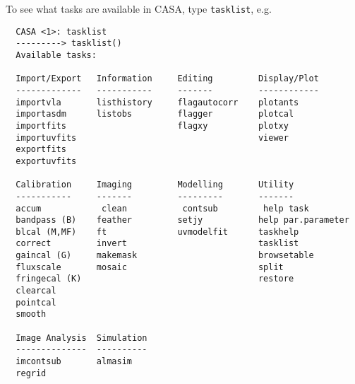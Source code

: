 To see what tasks are available in CASA, type {\tt tasklist}, e.g. 
\small
\begin{verbatim}
  CASA <1>: tasklist
  ---------> tasklist()
  Available tasks: 

  Import/Export   Information     Editing         Display/Plot
  -------------   -----------     -------         ------------
  importvla       listhistory     flagautocorr    plotants
  importasdm      listobs         flagger         plotcal 
  importfits                      flagxy          plotxy
  importuvfits                                    viewer
  exportfits
  exportuvfits

  Calibration     Imaging         Modelling       Utility
  -----------     -------         ---------       -------
  accum            clean           contsub         help task
  bandpass (B)    feather         setjy           help par.parameter
  blcal (M,MF)    ft              uvmodelfit      taskhelp
  correct         invert                          tasklist
  gaincal (G)     makemask                        browsetable
  fluxscale       mosaic                          split
  fringecal (K)                                   restore
  clearcal                                                
  pointcal 
  smooth

  Image Analysis  Simulation
  --------------  ----------
  imcontsub       almasim
  regrid
\end{verbatim}
\normalsize

